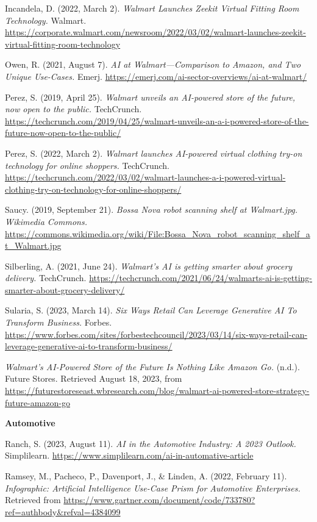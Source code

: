 \documentclass[
]{article}
\begin{document}
Incandela, D. (2022, March 2). \emph{Walmart Launches Zeekit Virtual Fitting Room Technology.} Walmart. \url{https://corporate.walmart.com/newsroom/2022/03/02/walmart-launches-zeekit-virtual-fitting-room-technology}

Owen, R. (2021, August 7). \emph{AI at Walmart---Comparison to Amazon, and Two Unique Use-Cases.} Emerj. \url{https://emerj.com/ai-sector-overviews/ai-at-walmart/}

Perez, S. (2019, April 25). \emph{Walmart unveils an AI-powered store of the future, now open to the public.} TechCrunch. \url{https://techcrunch.com/2019/04/25/walmart-unveils-an-a-i-powered-store-of-the-future-now-open-to-the-public/}

Perez, S. (2022, March 2). \emph{Walmart launches AI-powered virtual clothing try-on technology for online shoppers.} TechCrunch. \url{https://techcrunch.com/2022/03/02/walmart-launches-a-i-powered-virtual-clothing-try-on-technology-for-online-shoppers/}

Saucy. (2019, September 21). \emph{Bossa Nova robot scanning shelf at Walmart.jpg. Wikimedia Commons.} \url{https://commons.wikimedia.org/wiki/File:Bossa_Nova_robot_scanning_shelf_at_Walmart.jpg}

Silberling, A. (2021, June 24). \emph{Walmart's AI is getting smarter about grocery delivery.} TechCrunch. \url{https://techcrunch.com/2021/06/24/walmarts-ai-is-getting-smarter-about-grocery-delivery/}

Sularia, S. (2023, March 14). \emph{Six Ways Retail Can Leverage Generative AI To Transform Business.} Forbes. \url{https://www.forbes.com/sites/forbestechcouncil/2023/03/14/six-ways-retail-can-leverage-generative-ai-to-transform-business/}

\emph{Walmart's AI-Powered Store of the Future Is Nothing Like Amazon Go.} (n.d.). Future Stores. Retrieved August 18, 2023, from \url{https://futurestoreseast.wbresearch.com/blog/walmart-ai-powered-store-strategy-future-amazon-go}

\textbf{Automotive}

Ranch, S. (2023, August 11). \emph{AI in the Automotive Industry: A 2023 Outlook.} Simplilearn. \url{https://www.simplilearn.com/ai-in-automative-article}

Ramsey, M., Pacheco, P., Davenport, J., \& Linden, A. (2022, February 11). \emph{Infographic: Artificial Intelligence Use-Case Prism for Automotive Enterprises.} Retrieved from \url{https://www.gartner.com/document/code/733780?ref=authbody\&refval=4384099}
\end{document}
